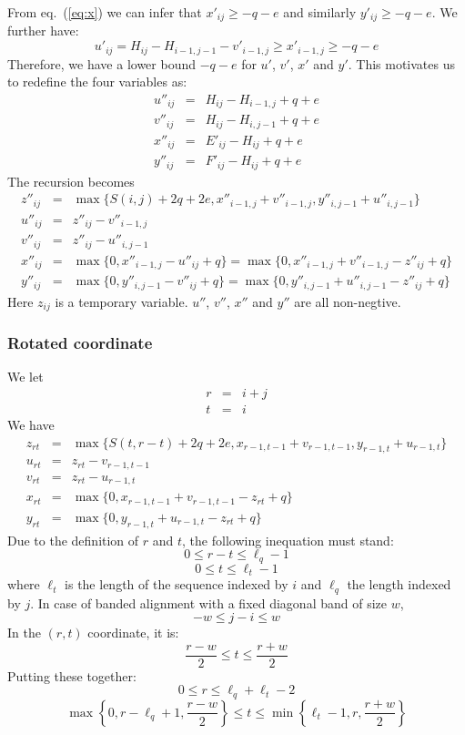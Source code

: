 \documentclass[10pt]{article}
\begin{document}
From eq.~(\ref{eq:x}) we can infer that $x'_{ij}\ge-q-e$ and similarly
$y'_{ij}\ge-q-e$. We further have:
\[
u'_{ij}=H_{ij}-H_{i-1,j-1}-v'_{i-1,j}\ge x'_{i-1,j}\ge-q-e
\]
Therefore, we have a lower bound $-q-e$ for $u'$, $v'$, $x'$ and $y'$.
This motivates us to redefine the four variables as:
\begin{eqnarray*}
u''_{ij}&=&H_{ij}-H_{i-1,j}+q+e\\
v''_{ij}&=&H_{ij}-H_{i,j-1}+q+e\\
x''_{ij}&=&E'_{ij}-H_{ij}+q+e\\
y''_{ij}&=&F'_{ij}-H_{ij}+q+e
\end{eqnarray*}
The recursion becomes
\begin{eqnarray*}
z''_{ij}&=&\max\{S(i,j)+2q+2e,x''_{i-1,j}+v''_{i-1,j},y''_{i,j-1}+u''_{i,j-1}\}\\
u''_{ij}&=&z''_{ij}-v''_{i-1,j}\\
v''_{ij}&=&z''_{ij}-u''_{i,j-1}\\
x''_{ij}&=&\max\{0,x''_{i-1,j}-u''_{ij}+q\}=\max\{0,x''_{i-1,j}+v''_{i-1,j}-z''_{ij}+q\}\\
y''_{ij}&=&\max\{0,y''_{i,j-1}-v''_{ij}+q\}=\max\{0,y''_{i,j-1}+u''_{i,j-1}-z''_{ij}+q\}
\end{eqnarray*}
Here $z_{ij}$ is a temporary variable. $u''$, $v''$, $x''$ and $y''$ are all
non-negtive.

\subsubsection{Rotated coordinate}

We let
\begin{eqnarray*}
r&=&i+j\\
t&=&i
\end{eqnarray*}
We have
\begin{eqnarray*}
z_{rt}&=&\max\{S(t,r-t)+2q+2e,x_{r-1,t-1}+v_{r-1,t-1},y_{r-1,t}+u_{r-1,t}\}\\
u_{rt}&=&z_{rt}-v_{r-1,t-1}\\
v_{rt}&=&z_{rt}-u_{r-1,t}\\
x_{rt}&=&\max\{0,x_{r-1,t-1}+v_{r-1,t-1}-z_{rt}+q\}\\
y_{rt}&=&\max\{0,y_{r-1,t}+u_{r-1,t}-z_{rt}+q\}
\end{eqnarray*}
Due to the definition of $r$ and $t$, the following inequation must stand:
\[0\le r-t \le\ell_q-1\]
\[0\le t \le\ell_t-1\]
where $\ell_t$ is the length of the sequence indexed by $i$ and $\ell_q$ the
length indexed by $j$. In case of banded alignment with a fixed diagonal band
of size $w$,
\[-w\le j-i\le w\]
In the $(r,t)$ coordinate, it is:
\[\frac{r-w}{2}\le t\le \frac{r+w}{2}\]
Putting these together:
\[0\le r\le \ell_q+\ell_t-2\]
\[\max\left\{0,r-\ell_q+1,\frac{r-w}{2}\right\}\le t\le\min\left\{\ell_t-1,r,\frac{r+w}{2}\right\}\]
\end{document}
